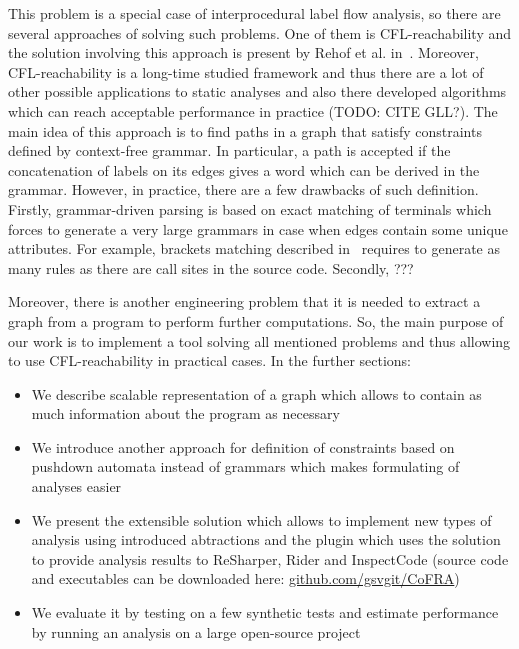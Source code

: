 This problem is a special case of interprocedural label flow analysis, so there are several approaches of solving such problems.
One of them is CFL-reachability and the solution involving this approach is present by Rehof et al. in~\cite{CFLr}.
Moreover, CFL-reachability is a long-time studied framework and thus there are a lot of other possible applications to static analyses and also there developed algorithms which can reach acceptable performance in practice (TODO: CITE GLL?).
The main idea of this approach is to find paths in a graph that satisfy constraints defined by context-free grammar.
In particular, a path is accepted if the concatenation of labels on its edges gives a word which can be derived in the grammar.
However, in practice, there are a few drawbacks of such definition.
Firstly, grammar-driven parsing is based on exact matching of terminals which forces to generate a very large grammars in case when edges contain some unique attributes.
For example, brackets matching described in~\cite{CFLr} requires to generate as many rules as there are call sites in the source code.
Secondly, ???

Moreover, there is another engineering problem that it is needed to extract a graph from a program to perform further computations.
So, the main purpose of our work is to implement a tool solving all mentioned problems and thus allowing to use CFL-reachability in practical cases.
In the further sections: 
\begin{itemize}
	\item We describe scalable representation of a graph which allows to contain as much information about the program as necessary
	\item We introduce another approach for definition of constraints based on pushdown automata instead of grammars which makes formulating of analyses easier
	\item We present the extensible solution which allows to implement new types of analysis using introduced abtractions and the plugin which uses the solution to provide analysis results to ReSharper, Rider and InspectCode (source code and executables can be downloaded here: \url{github.com/gsvgit/CoFRA})
	\item We evaluate it by testing on a few synthetic tests and estimate performance by running an analysis on a large open-source project
\end{itemize}

